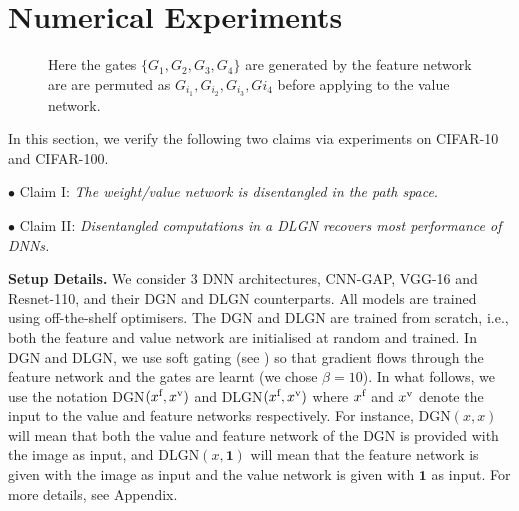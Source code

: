 \section{Numerical Experiments}\label{sec:dlgn}
\begin{figure}[!b]
\centering

\begin{minipage}{0.30\columnwidth}
\centering
\resizebox{0.99\columnwidth}{!}{

}
\end{minipage}
\begin{minipage}{0.30\columnwidth}
\centering
\resizebox{0.99\columnwidth}{!}{

}
\end{minipage}
\begin{minipage}{0.30\columnwidth}
\centering
\resizebox{0.99\columnwidth}{!}{

}
\end{minipage}
%
\caption{\small{Here the gates $\{G_1,G_2,G_3,G_4\}$ are generated by the feature network are are permuted as $G_{i_1},G_{i_2},G_{i_3},G{i_4}$ before applying to the value network.}}
\label{fig:c4gap}
\end{figure}
In this section, we verify the following two claims via experiments on CIFAR-10 and CIFAR-100.

$\bullet$ Claim I: \emph{The weight/value network is disentangled in the path space}. 

$\bullet$ Claim II: \emph{Disentangled computations in a DLGN recovers most performance of DNNs.}

\textbf{Setup Details.} We consider $3$ DNN architectures, CNN-GAP, VGG-16 and Resnet-110, and their DGN and DLGN counterparts. All models are trained using off-the-shelf optimisers. The DGN and DLGN are trained from scratch, i.e., both the feature and value network are initialised at random and trained. In DGN and DLGN, we use soft gating (see ) so that gradient flows through the feature network and the gates are learnt (we chose $\beta=10$).  In what follows, we use the notation DGN$(x^{\text{f}},x^{\text{v}})$ and DLGN$(x^{\text{f}},x^{\text{v}})$ where $x^{\text{f}}$ and $x^{\text{v}}$ denote the input to the value and feature networks respectively. For instance, DGN$(x,x)$ will mean that both the value and feature network of the DGN is provided with the image as input, and DLGN$(x,\mathbf{1})$ will mean that the feature network is given with the image as input and the value network is given with $\mathbf{1}$ as input. For more details, see Appendix.


